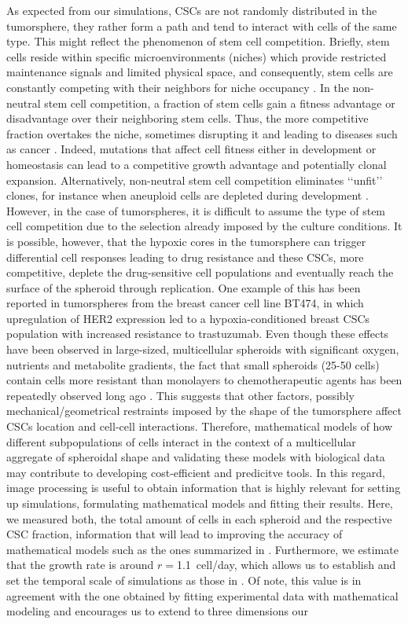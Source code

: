 \documentclass[fleqn,10pt]{wlscirep}
\begin{document}
As expected from our simulations, CSCs are not randomly distributed in the tumorsphere, they rather form a path and tend to interact with cells of the same type. This might reflect the phenomenon of stem cell competition. Briefly, stem cells reside within specific microenvironments (niches) which provide restricted maintenance signals and limited physical space, and consequently, stem cells are constantly competing with their neighbors for niche occupancy \cite{Stines2013}. In the non-neutral stem cell competition, a fraction of stem cells gain a fitness advantage or disadvantage over their neighboring stem cells. Thus, the more competitive fraction overtakes the niche, sometimes disrupting it and leading to diseases such as cancer \cite{Johnston2009}. Indeed, mutations that affect cell fitness either in development or homeostasis can lead to a competitive growth advantage and potentially clonal expansion. Alternatively, non-neutral stem cell competition eliminates ‘‘unfit’’ clones, for instance when aneuploid cells are depleted during development \cite{Derks2023}. However, in the case of tumorspheres, it is difficult to assume the type of stem cell competition due to the selection already imposed by the culture conditions. It is possible, however, that the hypoxic cores in the tumorsphere can trigger differential cell responses leading to drug resistance \cite{Fisher2020} and these CSCs, more competitive, deplete the drug-sensitive cell populations and eventually reach the surface of the spheroid through replication. One example of this has been reported in tumorspheres from the breast cancer cell line BT474, in which upregulation of HER2 expression led to a hypoxia-conditioned breast CSCs population with increased resistance to trastuzumab\cite{Rodriguez2018}. Even though these effects have been observed in large-sized, multicellular spheroids with significant oxygen, nutrients and metabolite gradients, the fact that small spheroids (25-50 cells) contain cells more resistant than monolayers to chemotherapeutic agents has been repeatedly observed long ago \cite{Olive1994}. This suggests that other factors, possibly mechanical/geometrical restraints imposed by the shape of the tumorsphere affect CSCs location and cell-cell interactions. Therefore, mathematical models of how different subpopulations of cells interact in the context of a multicellular aggregate of spheroidal shape and validating these models with biological data may contribute to developing cost-efficient and predicitve tools. In this regard, image processing is useful to obtain information that is highly relevant for setting up simulations, formulating mathematical models and fitting their results. Here, we measured both, the total amount of cells in each spheroid and the respective CSC fraction, information that will lead to improving the accuracy of mathematical models such as the ones summarized in \cite{barberis2021diff}. Furthermore, we estimate that the growth rate is around $r=$\SI{1.1}{cell/day}, which allows us to establish and set the temporal scale of simulations as those in \cite{barberis2021percolation}. Of note, this value is in agreement with the one obtained by fitting experimental data with mathematical modeling\cite{benitez2021} and encourages us to extend to three dimensions our 
\end{document}
